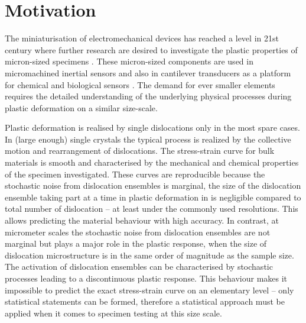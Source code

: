 \section{Motivation}
The miniaturisation of electromechanical devices has reached a level in 21st century where further research are desired to investigate the plastic properties of micron-sized specimens \cite{doi:10.1080/14786430600567739,NG20081712,doi:10.1080/14786430802132522,doi:10.1146/annurev-matsci-082908-145409,ZHOU20117673}. These micron-sized components are used in micromachined inertial sensors \cite{704269} and also in cantilever transducers as a platform for chemical and biological sensors \cite{doi:10.1063/1.1763252}. The demand for ever smaller elements requires the detailed understanding of the underlying physical processes during plastic deformation on a similar size-scale.

Plastic deformation is realised by single dislocations only in the most spare cases. In (large enough) single crystals the typical process is realized by the collective motion and rearrangement of dislocations. The stress-strain curve for bulk materials is smooth and characterised by the mechanical and chemical properties of the specimen investigated. These curves are reproducible because the stochastic noise from dislocation ensembles is marginal, the size of the dislocation ensemble taking part at a time in plastic deformation in is negligible compared to total number of dislocation -- at least under the commonly used resolutions. This allows predicting the material behaviour with high accuracy. In contrast, at micrometer scales the stochastic noise from dislocation ensembles are not marginal but plays a major role in the plastic response, when the size of dislocation microstructure is in the same order of magnitude as the sample size. The activation of dislocation ensembles can be characterised by stochastic processes leading to a discontinuous plastic response. This behaviour makes it impossible to predict the exact stress-strain curve on an elementary level -- only statistical statements can be formed, therefore a statistical approach must be applied when it comes to specimen testing at this size scale.

